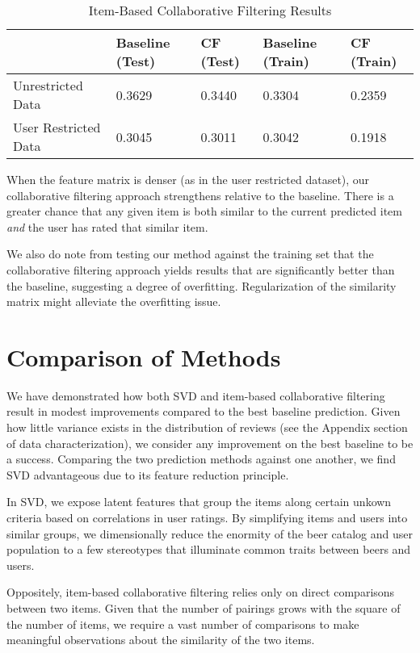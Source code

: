 \documentclass[12pt]{article}
\begin{document}
\begin{table}[ht!]
\centering
\caption{Item-Based Collaborative Filtering Results}
\label{my-label}
\begin{tabular}{lllll}
\hline
                        & Baseline (Test) & CF (Test) & Baseline (Train) & CF (Train) \\ \hline
Unrestricted Data     & 0.3629             & 0.3440                  & 0.3304              & 0.2359                   \\
User Restricted Data  & 0.3045             & 0.3011                  & 0.3042              & 0.1918                   \\ \hline
\end{tabular}
\end{table}

When the feature matrix is denser (as in the user restricted dataset), our collaborative filtering approach strengthens relative to the baseline. There is a greater chance that any given item is both similar to the current predicted item \textit{and} the user has rated that similar item.

We also do note from testing our method against the training set that the collaborative filtering approach yields results that are significantly better than the baseline, suggesting a degree of overfitting. Regularization of the similarity matrix might alleviate the overfitting issue.

\section{Comparison of Methods}
We have demonstrated how both SVD and item-based collaborative filtering result in modest improvements compared to the best baseline prediction. Given how little variance exists in the distribution of reviews (see the Appendix section of data characterization), we consider any improvement on the best baseline to be a success. Comparing the two prediction methods against one another, we find SVD advantageous due to its feature reduction principle.

In SVD, we expose latent features that group the items along certain unkown criteria based on correlations in user ratings. By simplifying items and users into similar groups, we dimensionally reduce the enormity of the beer catalog and user population to a few stereotypes that illuminate common traits between beers and users.

Oppositely, item-based collaborative filtering relies only on direct comparisons between two items. Given that the number of pairings grows with the square of the number of items, we require a vast number of comparisons to make meaningful observations about the similarity of the two items.
\end{document}
